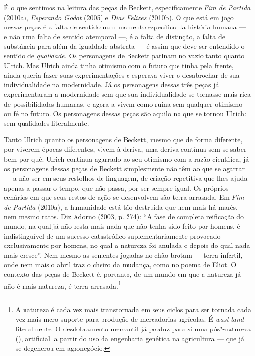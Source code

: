 É o que sentimos na leitura das peças de Beckett, especificamente
\emph{Fim de Partida} (2010a), \emph{Esperando Godot} (2005) e
\emph{Dias Felizes} (2010b). O que está em jogo nessas peças é a falta
de sentido num momento específico da história humana --- e não uma falta
de sentido atemporal ---, é a falta de distinção, a falta de substância
para além da igualdade abstrata --- é assim que deve ser entendido o sentido de
\emph{qualidade.} Os personagens de Beckett patinam no vazio tanto
quanto Ulrich. Mas Ulrich ainda tinha otimismo com o futuro que tinha
pela frente, ainda queria fazer suas experimentações e esperava viver o
desabrochar de sua individualidade na modernidade. Já os personagens
dessas três peças já experimentaram a modernidade sem que sua
individualidade se tornasse mais rica de possibilidades humanas, e agora
a vivem como ruína sem qualquer otimismo ou fé no futuro. Os personagens
dessas peças são aquilo no que se tornou Ulrich: sem qualidades
literalmente.

Tanto Ulrich quanto os personagens de Beckett, mesmo que de forma
diferente, por viverem épocas diferentes, vivem à deriva, uma deriva
contínua sem se saber bem por quê. Ulrich continua agarrado ao seu
otimismo com a razão científica, já os personagens dessas peças de
Beckett simplesmente não têm ao que se agarrar --- a não ser em seus
restolhos de linguagem, de criação repetitiva que lhes ajuda apenas a
passar o tempo, que não passa, por ser sempre igual. Os próprios
cenários em que seus restos de ação se desenvolvem são terra arrasada.
Em \emph{Fim de Partida} (2010a), a humanidade está tão destruída
que nem mais há marés, nem mesmo ratos. Diz Adorno (2003, p. 274): ``A
fase de completa reificação do mundo, na qual já não resta mais nada que
não tenha sido feito por homens, é indistinguível de um sucesso
catastrófico suplementariamente provocado exclusivamente por homens, no
qual a natureza foi anulada e depois do qual nada mais cresce''. Nem
mesmo as sementes jogadas no chão brotam --- terra infértil, onde nem
mais o abril traz o cheiro da mudança, como no poema de Eliot. O
contexto das peças de Beckett é, portanto, de um mundo em que a natureza
já não é mais natureza, é terra arrasada.\footnote{A natureza é cada vez
  mais transtornada em seus ciclos para ser tornada cada vez mais mero
  suporte para produção de mercadorias agrícolas. É \emph{wast land}
  literalmente. O desdobramento mercantil já produz para si uma
  pós"-natureza (), artificial, a partir do uso da engenharia
  genética na agricultura --- que já se degenerou em agronegócio.}

